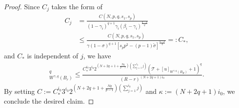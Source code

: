 \documentclass[10pt,a4paper]{amsart}
\begin{document}
\begin{proof}
	Since $C_j$ takes the form of 
	\begin{align*}
		C_j&=\frac{C\left(N, p, q, s_1, s_p\right)}{(1-\gamma_i)^{q+1}\gamma_i(\beta_i-\gamma_i)^{\frac{q-p}{q}}}\\
		& \le \frac{C\left(N, p, q, s_1, s_p\right)}{\gamma \left(1-\sigma\right)^{q+1}[s_pp^2-(p-1)\tilde{\sigma}]^{\frac{q-p}{q}}}=:C_*,
	\end{align*}
	and $C_*$ is independent of $j$, we have 
	\begin{align*}
		[u]_{W^{\gamma, q}\left(B_r\right)}^q \leq \frac{C_*^{i_0}  3^{i_0} 2^{\left(N+2q+1+\frac{Nq}{p-1}\right)\left(\sum\limits_{j=1}^{i_0} j\right)}\left(\mathcal{T}+[u]_{W^{\gamma,q}\left(B_R\right)}+1\right)^q}{(R-r)^{(N+2q+1)i_0}}.
	\end{align*}
	By setting $C:=C_*^{i_0}  3^{i_0}  2^{\left(N+2q+1+\frac{Nq}{p-1}\right)\left(\sum\limits_{j=1}^{i_0} j\right)}$ and $\kappa:=(N+2q+1) i_0$, we conclude the desired claim.
\end{proof}
\end{document}
